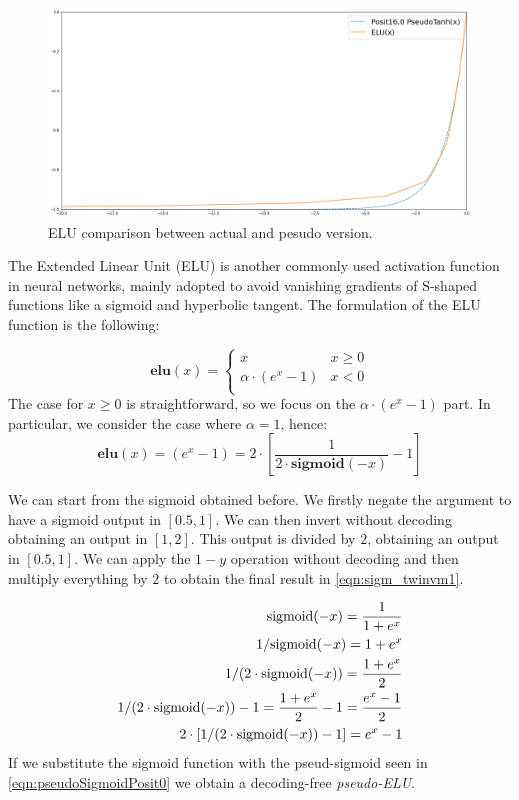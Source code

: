\begin{figure}
    \centering
    \includegraphics[width=\linewidth]{img/eluPosit160.png}
    \caption{ELU comparison between actual and pesudo version.}
    \label{fig:pseudoEluPosit0}
\end{figure}


The Extended Linear Unit (ELU) is another commonly used activation function in neural networks, mainly adopted to avoid vanishing gradients of S-shaped functions like a sigmoid and hyperbolic tangent.
The formulation of the ELU function is the following:

\begin{equation}
\mathbf{elu}(x)=\left\{\begin{matrix}
x & x \geq 0 \\
\alpha \cdot (e^x - 1) & x < 0  \\
\end{matrix}\right.
\end{equation}
The case for $x \geq 0$ is straightforward, so we focus on the $\alpha \cdot (e^x - 1)$ part. In particular, we consider the case where $\alpha = 1$, hence:
\begin{equation}
    \mathbf{elu}(x) = (e^x - 1) = 2 \cdot \left [ \frac{1}{2\cdot \mathbf{sigmoid}(-x)} - 1 \right]
\end{equation}

We can start from the sigmoid obtained before. We firstly negate the argument to have a sigmoid output in $[0.5,1]$. We can then invert without decoding obtaining an output in $[1,2]$. This output is divided by $2$, obtaining an output in $[0.5,1]$. We can apply the $1-y$ operation without decoding and then multiply everything by $2$ to obtain the final result in \eqref{eqn:sigm_twinvm1}.

\begin{align}
   \label{eqn:sigm_mx}\textnormal{sigmoid}(-x) = \frac{1}{1+e^{x}}  & \\
   \label{eqn:sigm_invx}1/\textnormal{sigmoid}(-x) = 1+e^x & \\
   \label{eqn:sigm_invtw}1/(2\cdot\textnormal{sigmoid}(-x)) = \frac{1+e^x}{2}& \\
   \label{eqn:sigm_invm1}1/(2\cdot\textnormal{sigmoid}(-x))-1 = \frac{1+e^x}{2} - 1 = \frac{e^x-1}{2} & \\
  \label{eqn:sigm_twinvm1}2\cdot[1/(2\cdot\textnormal{sigmoid}(-x))-1] = e^x -1&
\end{align}
If we substitute the sigmoid function with the pseud-sigmoid seen in \eqref{eqn:pseudoSigmoidPosit0} we obtain a decoding-free \textit{pseudo-ELU}.




